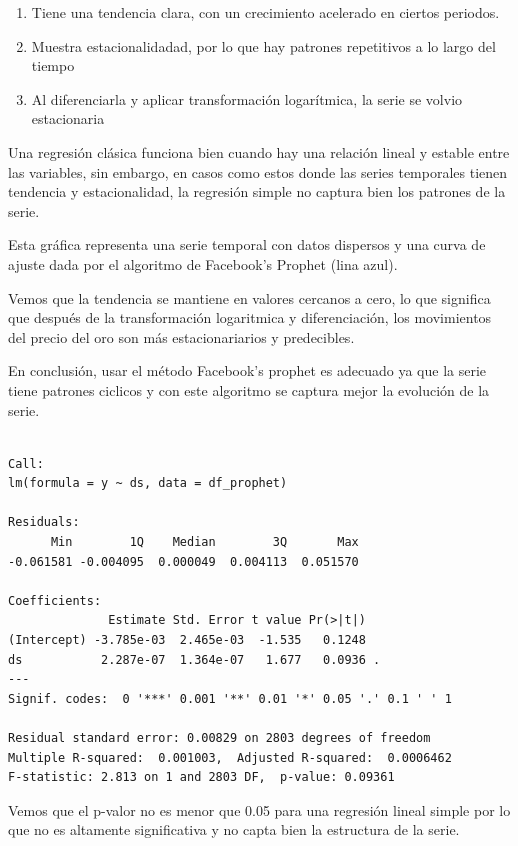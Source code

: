 \documentclass[
]{book}
\providecommand{\tightlist}{%
  \setlength{\itemsep}{0pt}\setlength{\parskip}{0pt}}
\begin{document}
\begin{enumerate}
\def\labelenumi{\arabic{enumi}.}
\tightlist
\item
  Tiene una tendencia clara, con un crecimiento acelerado en ciertos periodos.
\item
  Muestra estacionalidadad, por lo que hay patrones repetitivos a lo largo del tiempo
\item
  Al diferenciarla y aplicar transformación logarítmica, la serie se volvio estacionaria
\end{enumerate}

Una regresión clásica funciona bien cuando hay una relación lineal y estable entre las variables, sin embargo, en casos como estos donde las series temporales tienen
tendencia y estacionalidad, la regresión simple no captura bien los patrones de la serie.

Esta gráfica representa una serie temporal con datos dispersos y una curva de ajuste dada por el algoritmo de Facebook's Prophet (lina azul).

Vemos que la tendencia se mantiene en valores cercanos a cero, lo que significa que después de la transformación logaritmica y diferenciación, los movimientos del precio
del oro son más estacionariarios y predecibles.

En conclusión, usar el método Facebook's prophet es adecuado ya que la serie tiene patrones ciclicos y con este algoritmo se captura mejor la evolución de la serie.

\begin{verbatim}

Call:
lm(formula = y ~ ds, data = df_prophet)

Residuals:
      Min        1Q    Median        3Q       Max 
-0.061581 -0.004095  0.000049  0.004113  0.051570 

Coefficients:
              Estimate Std. Error t value Pr(>|t|)  
(Intercept) -3.785e-03  2.465e-03  -1.535   0.1248  
ds           2.287e-07  1.364e-07   1.677   0.0936 .
---
Signif. codes:  0 '***' 0.001 '**' 0.01 '*' 0.05 '.' 0.1 ' ' 1

Residual standard error: 0.00829 on 2803 degrees of freedom
Multiple R-squared:  0.001003,  Adjusted R-squared:  0.0006462 
F-statistic: 2.813 on 1 and 2803 DF,  p-value: 0.09361
\end{verbatim}

Vemos que el p-valor no es menor que 0.05 para una regresión lineal simple por lo que no es altamente significativa y no capta bien la estructura de la serie.
\end{document}
